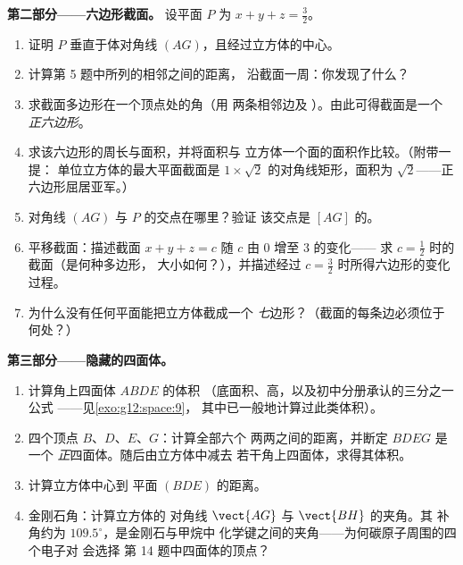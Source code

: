 \begin{problem}
\medskip
\noindent\textbf{第二部分——六边形截面。}
设平面 $P$ 为 $x + y + z = \frac32$。
\begin{enumerate}[resume]
  \item 证明 $P$ 垂直于体对角线
        $(AG)$，且经过立方体的中心。
  \item 计算第 5 题中所列的相邻之间的距离，
        沿截面一周：你发现了什么？
  \item 求截面多边形在一个顶点处的角（用
        两条相邻边及
        ）。由此可得截面是一个
        \emph{正六边形}。
  \item 求该六边形的周长与面积，并将面积与
        立方体一个面的面积作比较。（附带一提：
        单位立方体的最大平面截面是
        $1 \times \sqrt2$ 的对角线矩形，面积为
        $\sqrt2$——正六边形屈居亚军。）
  \item 对角线 $(AG)$ 与 $P$ 的交点在哪里？验证
        该交点是 $[AG]$ 的。
  \item 平移截面：描述截面
        $x + y + z = c$ 随 $c$ 由 $0$ 增至 $3$ 的变化——
        求 $c = \frac12$ 时的截面（是何种多边形，
        大小如何？），并描述经过
        $c = \frac32$ 时所得六边形的变化过程。
  \item 为什么没有任何平面能把立方体截成一个
        \emph{七}边形？（截面的每条边必须位于
        何处？）
\end{enumerate}

\medskip
\noindent\textbf{第三部分——隐藏的四面体。}
\begin{enumerate}[resume]
  \item 计算角上四面体 $ABDE$ 的体积
        （底面积、高，以及初中分册承认的三分之一公式
——见\cref{exo:g12:space:9}，
        其中已一般地计算过此类体积）。
  \item 四个顶点 $B$、$D$、$E$、$G$：计算全部六个
        两两之间的距离，并断定 $BDEG$ 是一个
        \emph{正}四面体。随后由立方体中减去
        若干角上四面体，求得其体积。
  \item 计算立方体中心到
        平面 $(BDE)$ 的距离。
  \item 金刚石角：计算立方体的
        对角线 $\vect{AG}$ 与 $\vect{BH}$ 的夹角。其
        补角约为 $109.5^\circ$，是金刚石与甲烷中
        化学键之间的夹角——为何碳原子周围的四个电子对
        会选择
        第 14 题中四面体的顶点？
\end{enumerate}


\end{problem}
